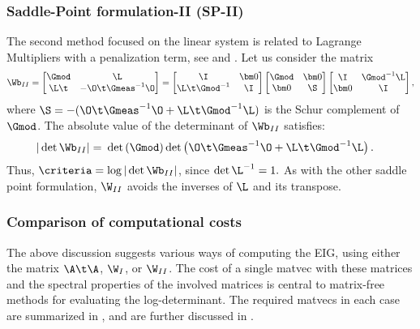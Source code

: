 \documentclass{aims} %
\theoremstyle{definition}
\begin{document}
\subsubsection{Saddle-Point formulation-II (SP-II)} 
The second method focused on the linear system is related to Lagrange Multipliers with a penalization term, see  \cite{Benzi}  and \cite[Section 2]{Gatica}. 
Let us consider the matrix
 \begin{align}
  \Wb_{II} =
\begin{bmatrix}
  \Gmod  & \L \\
 \L\t &  -\O\t \Gmeas^{-1} \O \\
\end{bmatrix}= 
\begin{bmatrix}
  \I  & \bm 0 \\
 \L\t \Gmod^{-1} &  \I \\
\end{bmatrix}
\begin{bmatrix}
  \Gmod  & \bm 0 \\
 \bm 0 &  \S \\
\end{bmatrix}
\begin{bmatrix}
  \I  & \Gmod^{-1} \L \\
  \bm 0 &  \I \\
\end{bmatrix},\label{eq:Saddle2}
\end{align}
where $\S= -(\O\t \Gmeas^{-1} \O +\L\t \Gmod^{-1} \L )$ is the Schur complement of $\Gmod$.  
The absolute value of the determinant of  $\Wb_{II}$ satisfies:
\begin{align*}
    |\det \Wb_{II}| 
     &=\> \det\left( \Gmod \right) \det\left( \O\t \Gmeas^{-1}\O + \L\t \Gmod^{-1} \L \right).
\end{align*}
Thus,  $\criteria = \log|\det \Wb_{II}|$, since $\det \L^{-1} =1.$ As with the other saddle point formulation, $\W_{II}$ avoids the inverses of $\L$ and its transpose. 

\subsubsection{Comparison of computational costs}
The above discussion suggests various ways of computing the
EIG, using either the matrix $\A\t\A$, $\W_{I}$, or $\W_{II}$. 
 The cost of a single matvec with these matrices and the spectral properties of the involved matrices is central to matrix-free methods for evaluating the log-determinant. 
The required matvecs in each case are summarized in , and are further discussed in .  
\end{document}
